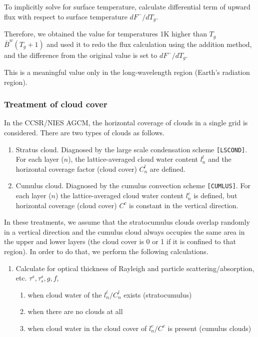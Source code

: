 To implicitly solve for surface temperature, calculate differential term of
upward flux with respect to surface temperature \(dF^-/dT_g\). 

Therefore, we obtained the value for temperatures 1K higher than
\(T_g\) \(\overline{B}^w(T_g+1)\) and used it to redo
the flux calculation using the addition method, and the difference from the
original value is set to \(dF^-/dT_g\). 

This is a meaningful value only
in the long-wavelength region (Earth's radiation region).

\hypertarget{treatment-of-cloud-cover}{%
\subsubsection{Treatment of cloud cover}\label{treatment-of-cloud-cover}}

In the CCSR/NIES AGCM, the horizontal coverage of clouds in
a single grid is considered. There are two types of clouds as follows.

\begin{enumerate}
\def\labelenumi{\arabic{enumi}.}
\item
  Stratus cloud. Diagnosed by the large scale condensation scheme
  \texttt{{[}LSCOND{]}}. For each layer (\(n\)), the
  lattice-averaged cloud water content \(l^l_n\) and the horizontal
  coverage factor (cloud cover) \(C^l_n\) are defined.
\item
  Cumulus cloud. Diagnosed by the cumulus convection scheme
  \texttt{{[}CUMLUS{]}}. For each layer (\(n\)) the
  lattice-averaged cloud water content \(l^c_n\) is defined, but
  horizontal coverage (cloud cover) \(C^c\) is constant in the
  vertical direction.
\end{enumerate}

In these treatments, we assume that the stratocumulus clouds overlap
randomly in a vertical direction and the cumulus cloud always
occupies the same area in the upper and lower layers (the
cloud cover is 0 or 1 if it is confined to that region). In order to do that, we
perform the following calculations.

\begin{enumerate}
\def\labelenumi{\arabic{enumi}.}
\item
  Calculate for optical thickness of Rayleigh and particle scattering/absorption, etc.
  \(\tau^s, \tau_s^s, g, f\),

  \begin{enumerate}
  \def\labelenumii{\arabic{enumii}.}
  \item
    when cloud water of the \(l^l_n/C^l_n\) exists (stratocumulus)
  \item
    when there are no clouds at all
  \item
    when cloud water in the cloud cover of \(l^c_n/C^c\) is present
    (cumulus clouds)
  \end{enumerate}
\end{enumerate}


